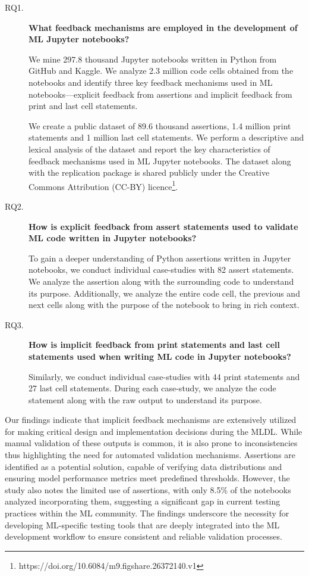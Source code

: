 \documentclass[smallextended]{svjour3}       %
\begin{document}
\begin{description}
	\item[RQ1.] \textbf{What feedback mechanisms are employed in the development of ML Jupyter notebooks?}

	      We mine 297.8 thousand Jupyter notebooks written in Python from GitHub and Kaggle. We analyze 2.3 million code cells obtained from the notebooks and identify three key feedback mechanisms used in ML notebooks---explicit feedback from assertions and implicit feedback from print and last cell statements.

	      We create a public dataset of 89.6 thousand assertions, 1.4 million print statements and 1 million last cell statements. We perform a descriptive and lexical analysis of the dataset and report the key characteristics of feedback mechanisms used in ML Jupyter notebooks. The dataset along with the replication package is shared publicly under the Creative Commons Attribution (CC-BY) licence\footnote{https://doi.org/10.6084/m9.figshare.26372140.v1}.

	\item[RQ2.] \textbf{How is explicit feedback from assert statements used to validate ML code written in Jupyter notebooks?}

	      To gain a deeper understanding of Python assertions written in Jupyter notebooks, we conduct individual case-studies with 82 assert statements. We analyze the assertion along with the surrounding code to understand its purpose. Additionally, we analyze the entire code cell, the previous and next cells along with the purpose of the notebook to bring in rich context.

	\item[RQ3.] \textbf{How is implicit feedback from print statements and last cell statements used when writing ML code in Jupyter notebooks?}

	      Similarly, we conduct individual case-studies with 44 print statements and 27 last cell statements. During each case-study, we analyze the code statement along with the raw output to understand its purpose.
\end{description}

Our findings indicate that implicit feedback mechanisms are extensively utilized for making critical design and implementation decisions during the MLDL. While manual validation of these outputs is common, it is also prone to inconsistencies thus highlighting the need for automated validation mechanisms. Assertions are identified as a potential solution, capable of verifying data distributions and ensuring model performance metrics meet predefined thresholds. However, the study also notes the limited use of assertions, with only 8.5\% of the notebooks analyzed incorporating them, suggesting a significant gap in current testing practices within the ML community. The findings underscore the necessity for developing ML-specific testing tools that are deeply integrated into the ML development workflow to ensure consistent and reliable validation processes.
\end{document}

